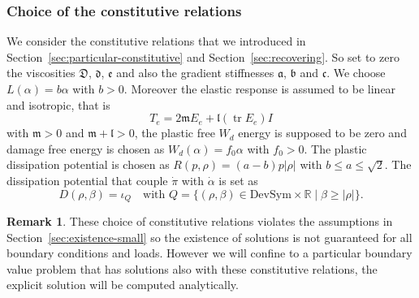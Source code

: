 \documentclass[a4paper,10pt,oneside]{amsbook}
\numberwithin{section}{chapter}
\numberwithin{equation}{chapter}
\theoremstyle{definition}
\newtheorem{rmk}[prop]{Remark}
\DeclareMathOperator{\tr}{tr}
\begin{document}
\subsubsection*{Choice of the constitutive relations} We consider the constitutive relations that we introduced in Section~\ref{sec:particular-constitutive} and Section~\ref{sec:recovering}. So set to zero the viscosities $\mathfrak D$, $\mathfrak{d}$, $\mathfrak{e}$ and also the gradient stiffnesses $\mathfrak{a}$, $\mathfrak{b}$ and $\mathfrak{c}$. We choose $L(\alpha)=b\alpha$ with $b>0$. Moreover the elastic response is assumed to be linear and isotropic, that is
\[
T_e=2\mathfrak{m}E_e+\mathfrak{l}(\tr E_e)I
\]
with $\mathfrak{m}>0$ and $\mathfrak{m}+\mathfrak{l}>0$, the plastic free $W_d$ energy is supposed to be zero and damage free energy is chosen as $W_d(\alpha)=f_0\alpha$ with $f_0>0$. The plastic dissipation potential is chosen as $R(p,\rho)=(a-b)p|\rho|$ with $b\le a\le\sqrt{2}$. The dissipation potential that couple $\dot\pi$ with $\dot\alpha$ is set as
\[
D(\rho,\beta)=\iota_Q\quad\text{with $Q=\{(\rho,\beta)\in\text{DevSym}\times\mathbb{R}\;|\;\beta\ge|\rho|\}$}.
\]
\begin{rmk}
These choice of constitutive relations violates the assumptions in Section~\ref{sec:existence-small} so the existence of solutions is not guaranteed for all boundary conditions and loads. However we will confine to a particular boundary value problem that has solutions also with these constitutive relations, the explicit solution will be computed analytically. 
\end{rmk}
\end{document}
